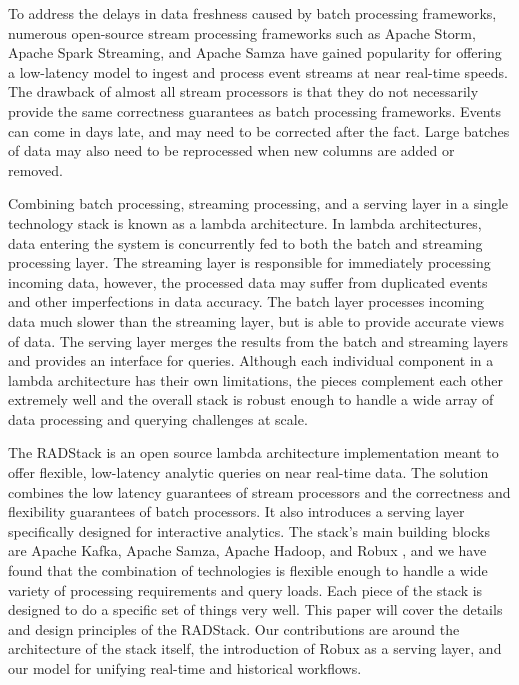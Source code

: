 \documentclass{vldb}
\begin{document}
To address the delays in data freshness caused by batch processing
frameworks, numerous open-source stream processing frameworks such as Apache
Storm\cite{marz2013storm}, Apache Spark Streaming\cite{zaharia2012discretized},
and Apache Samza\cite{2014samza} have gained popularity for offering a
low-latency model to ingest and process event streams at near real-time speeds.
The drawback of almost all stream processors is that they do not
necessarily provide the same correctness guarantees as batch processing
frameworks. Events can come in days late, and may need to be corrected after
the fact. Large batches of data may also need to be reprocessed when new
columns are added or removed.

Combining batch processing, streaming processing, and a serving layer in a
single technology stack is known as a lambda
architecture\cite{hausenblas2014lambda}. In lambda architectures, data entering
the system is concurrently fed to both the batch and streaming processing
layer. The streaming layer is responsible for immediately processing incoming
data, however, the processed data may suffer from duplicated events and other
imperfections in data accuracy. The batch layer processes incoming data much
slower than the streaming layer, but is able to provide accurate views of data.
The serving layer merges the results from the batch and streaming layers and
provides an interface for queries. Although each individual component in a
lambda architecture has their own limitations, the pieces complement each other
extremely well and the overall stack is robust enough to handle a wide array of
data processing and querying challenges at scale. 

The RADStack is an open source lambda architecture implementation meant to offer flexible,
low-latency analytic queries on near real-time data. The solution combines the
low latency guarantees of stream processors and the correctness and flexibility
guarantees of batch processors. It also introduces a serving layer specifically
designed for interactive analytics. The stack’s main building blocks are Apache
Kafka\cite{kreps2011kafka}, Apache Samza, Apache Hadoop, and Robux
\cite{yang2014robux}, and we have found that the combination of technologies is
flexible enough to handle a wide variety of processing requirements and query
loads. Each piece of the stack is designed to do a specific set of things very
well. This paper will cover the details and design principles of the RADStack.
Our contributions are around the architecture of the stack itself, the
introduction of Robux as a serving layer, and our model for unifying real-time
and historical workflows.
\end{document}
